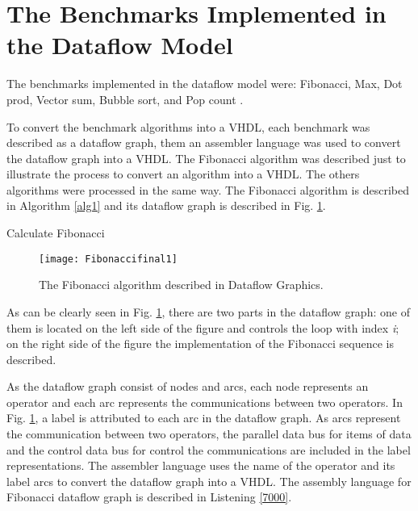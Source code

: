 \documentclass[preprint,12pt]{elsarticle}
\begin{document}
\section{The Benchmarks Implemented in the Dataflow Model}\label{l3}

The benchmarks implemented in the dataflow model were: Fibonacci, Max, Dot prod, Vector sum, Bubble sort, and Pop count \cite{r83}.

To convert the benchmark algorithms into a VHDL, each benchmark was described as a dataflow graph, them an assembler language was used to convert the dataflow graph into a VHDL. The Fibonacci algorithm was described just to illustrate the process to convert an algorithm into a VHDL. The others algorithms were processed in the same way. The Fibonacci algorithm is described in Algorithm \ref{alg1} and its dataflow graph is described in Fig. \ref{f7}.


\begin{algorithm}
\caption{Calculate Fibonacci}
\label{alg1}
\begin{algorithmic}
\STATE 
\STATE 
\STATE 
{}
\STATE 
\STATE 
\STATE 
\ENDFOR
\end{algorithmic}
\end{algorithm}

\begin{figure}[h]
\begin{center}
   \texttt{[image: Fibonaccifinal1]}
   \caption{The Fibonacci algorithm described in Dataflow Graphics.} \label{f7}
\end{center}
\end{figure}


As can be clearly seen in Fig. \ref{f7}, there are two parts in the dataflow graph: one of them is located on the left side of the figure and controls the loop with index {\it i}; on the right side of the figure the implementation of the Fibonacci sequence is described.

As the dataflow graph consist of nodes and arcs, each node represents an operator and each arc represents the communications between two operators. In Fig. \ref{f7}, a label is attributed to each arc in the dataflow graph. As arcs represent the communication between two operators, the parallel data bus for items of data and the control data bus for control the communications are included in the label representations. The assembler language uses the name of the operator and its label arcs to convert the dataflow graph into a VHDL. The assembly language for Fibonacci dataflow graph is described in Listening \ref{7000}.
\end{document}
